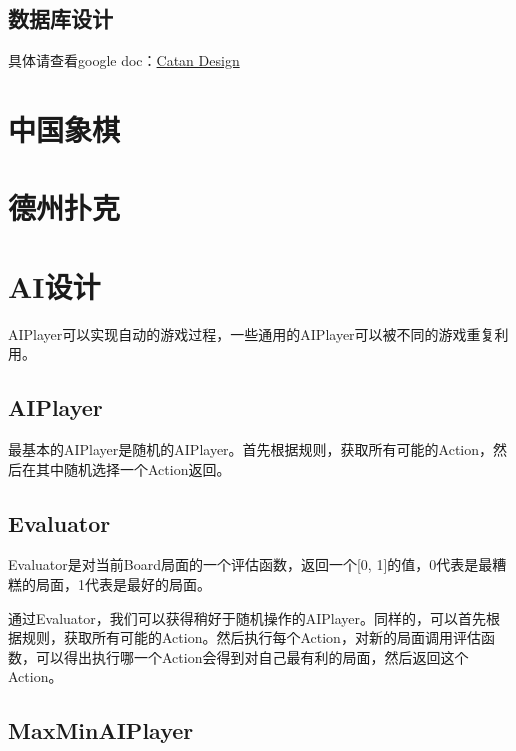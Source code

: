 \documentclass[export, 12pt, letterpaper]{ctexrep}
\begin{document}
\section{数据库设计}

具体请查看google doc：\href{https://docs.google.com/document/d/1gYzo6ib2sot4ynA650sstkFq2iVueK_y3jLf3UaaeWU/edit?usp=sharing}{Catan Design}

 

\chapter{中国象棋}

\begin{center}

\end{center}


\chapter{德州扑克}

\chapter{AI设计}

AIPlayer可以实现自动的游戏过程，一些通用的AIPlayer可以被不同的游戏重复利用。


\section{AIPlayer}
最基本的AIPlayer是随机的AIPlayer。首先根据规则，获取所有可能的Action，然后在其中随机选择一个Action返回。


\section{Evaluator}

Evaluator是对当前Board局面的一个评估函数，返回一个[0, 1]的值，0代表是最糟糕的局面，1代表是最好的局面。

通过Evaluator，我们可以获得稍好于随机操作的AIPlayer。同样的，可以首先根据规则，获取所有可能的Action。然后执行每个Action，对新的局面调用评估函数，可以得出执行哪一个Action会得到对自己最有利的局面，然后返回这个Action。

\section{MaxMinAIPlayer}
\end{document}
